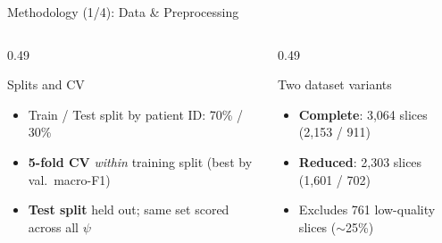 \documentclass[aspectratio=169]{beamer}
\begin{document}
\begin{frame}{Methodology (1/4): Data \& Preprocessing}
  \vspace{0.3em}
  \begin{columns}[T]
    \begin{column}{0.49\textwidth}
      {%
      \begin{block}{Splits and CV}
        \scriptsize
        \begin{itemize}
          \item Train / Test split by patient ID: 70\% / 30\%
          \item \textbf{5-fold CV} \emph{within} training split (best by val.\ macro-F1)
          \item \textbf{Test split} held out; same set scored across all $\psi$
        \end{itemize}
      \end{block}}
    \end{column}
    \begin{column}{0.49\textwidth}
      {%
      \begin{block}{Two dataset variants}
        \scriptsize
        \begin{itemize}
          \item \textbf{Complete}: 3{,}064 slices (2,153 / 911)
          \item \textbf{Reduced}: 2{,}303 slices (1,601 / 702)
          \item Excludes 761 low-quality slices ($\sim$25\%)
        \end{itemize}
      \end{block}}
    \end{column}
  \end{columns}
\end{frame}
\end{document}
